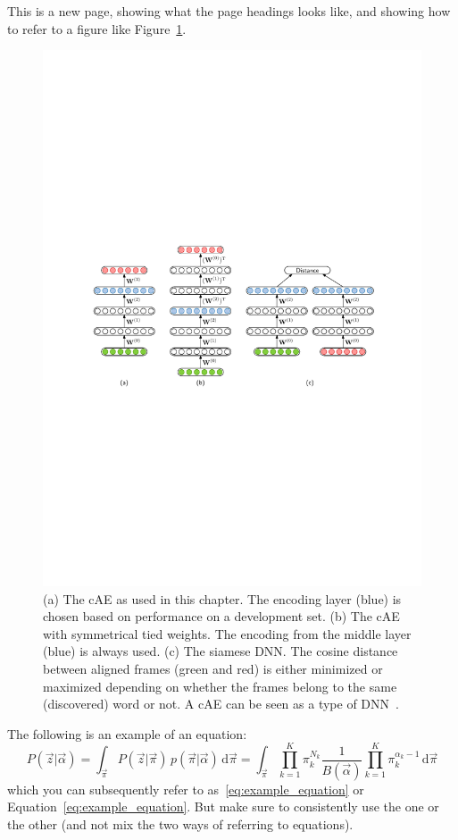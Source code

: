 \newpage

This is a new page, showing what the page headings looks like, and showing how to refer to a figure like Figure~\ref{fig:cae_siamese}.

\begin{figure}[!t]
    \centering
    \includegraphics[width=0.918\linewidth]{cae_siamese}
    \caption[I am the short caption that appears in the list of figures, without references.]{
    (a) The cAE as used in this chapter. The encoding layer (blue) is chosen based on performance on a development set.
    (b) The cAE with symmetrical tied weights. The encoding from the middle layer (blue) is always used.
    (c) The siamese DNN. The cosine distance between aligned frames (green and red) is either minimized or maximized depending on whether the frames belong to the same (discovered) word or not.
    A cAE can be seen as a type of DNN~\cite{dahl+etal_taslp12}.
    }
    \label{fig:cae_siamese}
\end{figure}


The following is an example of an equation:
\begin{equation}
P(\vec{z} | \vec{\alpha}) = \int_{\vec{\pi}} P(\vec{z} | \vec{\pi}) \, p(\vec{\pi} | \vec{\alpha}) \, \textrm{d} \vec{\pi}
= \int_{\vec{\pi}} \prod_{k = 1}^K \pi_k^{N_k} \frac{1}{B(\vec{\alpha})} \prod_{k = 1}^K \pi_k^{\alpha_k - 1} \, \textrm{d} \vec{\pi}
\label{eq:example_equation}
\end{equation}
which you can subsequently refer to as~\eqref{eq:example_equation} or Equation~\ref{eq:example_equation}.
But make sure to consistently use the one or the other (and not mix the two ways of referring to equations).